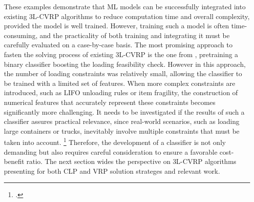 \parbreak

These examples demonstrate that \gls{ML} models can be successfully integrated into existing \gls{3L-CVRP}
algorithms to reduce computation time and overall complexity, provided the model is well trained.
However, training such a model is often time-consuming, and the practicality of both training and
integrating it must be carefully evaluated on a case-by-case basis. The most promising approach to
fasten the solving process of existing \gls{3L-CVRP} is the one from \cite{zhang_learning-based_2022},
pretraining a binary classifier boosting the loading feasibility check. However in this approach,
the number of loading constraints was relatively small, allowing the classifier
to be trained with a limited set of features. When more complex constraints are introduced, such as
\gls{LIFO} unloading rules or item fragility, the construction of numerical features that accurately
represent these constraints becomes significantly more challenging. It needs to be investigated if
the results of such a classifier assures practical relevance, since real-world
scenarios, such as loading large containers or trucks, inevitably involve multiple constraints that
must be taken into account. \footcite[cf.][pp. 1--2]{bischoff_issues_1995}
Therefore, the development of a classifier is not only demanding but also
requires careful consideration to ensure a favorable cost-benefit ratio. The next section wides the perspective
on \gls{3L-CVRP} algorithms presenting for both \gls{CLP} and \gls{VRP} solution strateges and relevant work.


